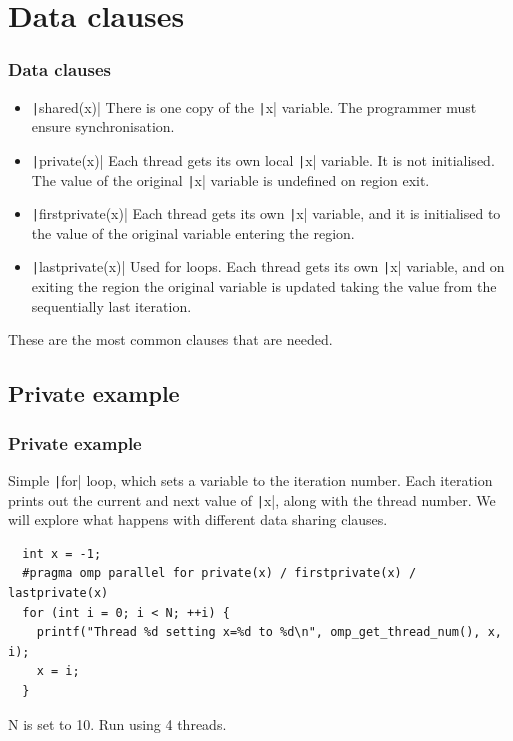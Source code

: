 \documentclass[aspectratio=169]{beamer}
\begin{document}
\section{Data clauses}
\begin{frame}
\frametitle{Data clauses}
\begin{itemize}
  \item \texttt|shared(x)|
    There is one copy of the \texttt|x| variable. The programmer must ensure synchronisation.
  \item \texttt|private(x)|
    Each thread gets its own local \texttt|x| variable. It is not initialised. The value of the original \texttt|x| variable is undefined on region exit.
  \item \texttt|firstprivate(x)|
    Each thread gets its own \texttt|x| variable, and it is initialised to the value of the original variable entering the region.
  \item \texttt|lastprivate(x)|
    Used for loops. Each thread gets its own \texttt|x| variable, and on exiting the region the original variable is updated taking the value from the sequentially last iteration.
\end{itemize}

These are the most common clauses that are needed.
\end{frame}

\subsection{Private example}
\begin{frame}[fragile]
\frametitle{Private example}
Simple \texttt|for| loop, which sets a variable to the iteration number.
Each iteration prints out the current and next value of \texttt|x|, along with the thread number.
We will explore what happens with different data sharing clauses.

\begin{verbatim}
  int x = -1;
  #pragma omp parallel for private(x) / firstprivate(x) / lastprivate(x)
  for (int i = 0; i < N; ++i) {
    printf("Thread %d setting x=%d to %d\n", omp_get_thread_num(), x, i);
    x = i;
  }
\end{verbatim}
N is set to 10.
Run using 4 threads.
\end{frame}
\end{document}
